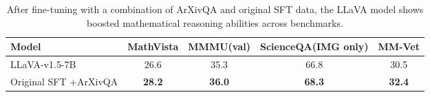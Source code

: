 
\begin{table*}[t!]
    \centering
    \small 
    \begin{tabular}{l|c c c c}
        \toprule
        Model & MathVista & MMMU(val) & ScienceQA(IMG only) & MM-Vet \\
        \midrule
        LLaVA-v1.5-7B & 26.6 & 35.3 & 66.8 & 30.5 \\
        \quad Original SFT +ArXivQA & \textbf{28.2} & \textbf{36.0} & \textbf{68.3} & \textbf{32.4} \\
        \bottomrule
    \end{tabular}
    \caption{After fine-tuning with a combination of ArXivQA and original SFT data, the LLaVA model shows boosted mathematical reasoning abilities across benchmarks.}
    \label{tab:llava_performance}
\end{table*}